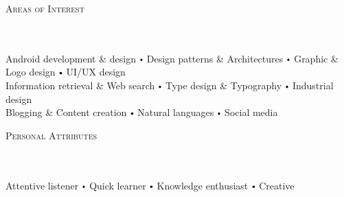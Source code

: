 \documentclass{article}
\newcommand{\header}[1]{{
\hspace*{-15pt}\vspace*{6pt} \textsc{#1}} \vspace*{-6pt} 
\lineunder
}
\newcommand{\lineunder}{
\vspace*{-8pt} \\ \hspace*{-18pt} 
\hrulefill \\
}
\newcommand{\content}{
\vspace*{2pt}%
}
\renewcommand{\labelitemi}{
$\vcenter{\hbox{\tiny$\bullet$}}$\hspace*{3pt}
}
\begin{document}
\vspace*{4pt}%
\header{Areas of Interest}
    \content{Android development \& design \labelitemi Design patterns \& Architectures \labelitemi Graphic \& Logo design \labelitemi UI/UX design \\ Information retrieval \& Web search \labelitemi Type design \& Typography \labelitemi Industrial design \\ Blogging \& Content creation \labelitemi Natural languages \labelitemi Social media \vspace{5pt}}

\vspace*{4pt}%
\header{Personal Attributes}
    \content{Attentive listener \labelitemi Quick learner \labelitemi Knowledge enthusiast \labelitemi Creative\vspace{5pt}}
\end{document}
